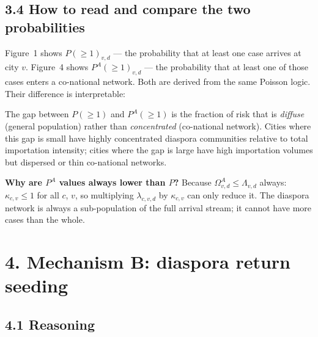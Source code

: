 \documentclass[11pt]{article}
\begin{document}
\subsection*{3.4 How to read and compare the two probabilities}

Figure~1 shows $P(\geq 1)_{v,d}$ --- the probability that at least one
case arrives at city $v$. Figure~4 shows $P^A(\geq 1)_{v,d}$ --- the
probability that at least one of those cases enters a co-national network.
Both are derived from the same Poisson logic. Their difference is
interpretable:

\medskip
\noindent{}

\medskip
The gap between $P(\geq 1)$ and $P^A(\geq 1)$ is the fraction of risk
that is \emph{diffuse} (general population) rather than
\emph{concentrated} (co-national network). Cities where this gap is
small have highly concentrated diaspora communities relative to total
importation intensity; cities where the gap is large have high importation
volumes but dispersed or thin co-national networks.

\textbf{Why are $P^A$ values always lower than $P$?} Because
$\Omega^A_{v,d} \leq \Lambda_{v,d}$ always: $\kappa_{c,v} \leq 1$
for all $c$, $v$, so multiplying $\lambda_{c,v,d}$ by $\kappa_{c,v}$
can only reduce it. The diaspora network is always a sub-population of
the full arrival stream; it cannot have more cases than the whole.

\section*{4. Mechanism B: diaspora return seeding}

\subsection*{4.1 Reasoning}
\end{document}

